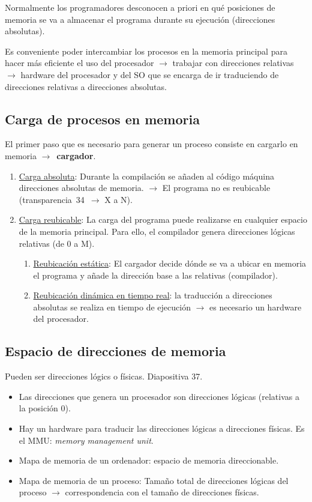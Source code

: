 Normalmente los programadores desconocen a priori en qué posiciones de memoria se va a almacenar el programa durante su ejecución (direcciones absolutas).

Es conveniente poder intercambiar los procesos en la memoria principal para hacer más eficiente el uso del procesador $\longrightarrow$ trabajar con direcciones relativas $\longrightarrow$ hardware del procesador y del SO que se encarga de ir traduciendo de direcciones relativas a direcciones absolutas.

\subsection{Carga de procesos en memoria}
El primer paso que es necesario para generar un proceso consiste en cargarlo en memoria $\longrightarrow$~\textbf{cargador}.
\begin{enumerate}
    \item \underline{Carga absoluta}: Durante la compilación se añaden al código máquina direcciones absolutas de memoria. $\longrightarrow$ El programa no es reubicable (transparencia~34~$\longrightarrow$ X a N).

    \item \underline{Carga reubicable}: La carga del programa puede realizarse en cualquier espacio de la memoria principal. Para ello, el compilador genera direcciones lógicas relativas (de 0 a M).
    \begin{enumerate}
        \item \underline{Reubicación estática}: El cargador decide dónde se va a ubicar en memoria el programa y añade la dirección base a las relativas (compilador).
        \item \underline{Reubicación dinámica en tiempo real}: la traducción a direcciones absolutas se realiza en tiempo de ejecución $\longrightarrow$ es necesario un hardware del procesador.
    \end{enumerate}
\end{enumerate}

\subsection{Espacio de direcciones de memoria}
Pueden ser direcciones lógics o físicas. Diapositiva 37.
\begin{itemize}
    \item Las direcciones que genera un procesador son direcciones lógicas (relativas a la posición 0).
    \item Hay un hardware para traducir las direcciones lógicas a direcciones físicas. Es el MMU: \textit{memory management unit}.
    \item Mapa de memoria de un ordenador: espacio de memoria direccionable.
    \item Mapa de memoria de un proceso: Tamaño total de direcciones lógicas del proceso $\longrightarrow$ correspondencia con el tamaño de direcciones físicas.
\end{itemize}


